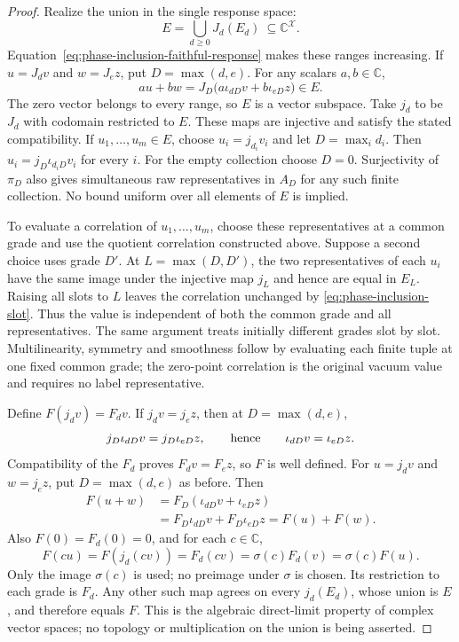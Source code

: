 \begin{proof}
Realize the union in the single response space:
\[
               E=\bigcup_{d\ge0}J_d(E_d)
                    \ \subseteq\mathbb C^{\mathcal X}.
\]
Equation~\eqref{eq:phase-inclusion-faithful-response} makes these ranges
increasing. If $u=J_dv$ and $w=J_ez$, put $D=\max(d,e)$. For any scalars
$a,b\in\mathbb C$,
\[
 au+bw=J_D\bigl(a\iota_{dD}v+b\iota_{eD}z\bigr)\in E.
\]
The zero vector belongs to every range, so $E$ is a vector subspace.
Take $j_d$ to be $J_d$ with codomain restricted to $E$. These maps are
injective and satisfy the stated compatibility. If $u_1,\ldots,u_m\in E$,
choose $u_i=j_{d_i}v_i$ and let $D=\max_i d_i$. Then
$u_i=j_D\iota_{d_iD}v_i$ for every $i$. For the empty collection choose
$D=0$. Surjectivity of $\pi_D$ also gives simultaneous raw representatives
in $A_D$ for any such finite collection. No bound uniform over all elements
of $E$ is implied.

To evaluate a correlation of $u_1,\ldots,u_m$, choose these representatives
at a common grade and use the quotient correlation constructed above.
Suppose a second choice uses grade $D'$. At $L=\max(D,D')$, the two
representatives of each $u_i$ have the same image under the injective map
$j_L$ and hence are equal in $E_L$. Raising all slots to $L$ leaves the
correlation unchanged by \eqref{eq:phase-inclusion-slot}. Thus the value
is independent of both the common grade and all representatives. The same
argument treats initially different grades slot by slot. Multilinearity,
symmetry and smoothness follow by evaluating each finite tuple at one
fixed common grade; the zero-point correlation is the original vacuum
value and requires no label representative.

Define $F(j_dv)=F_dv$. If $j_dv=j_ez$, then at $D=\max(d,e)$,
\[
 j_D\iota_{dD}v=j_D\iota_{eD}z,
 \qquad\hbox{hence}\qquad \iota_{dD}v=\iota_{eD}z.
\]
Compatibility of the $F_d$ proves $F_dv=F_ez$, so $F$ is well defined.
For $u=j_dv$ and $w=j_ez$, put $D=\max(d,e)$ as before. Then
\[
 \begin{aligned}
 F(u+w)&=F_D(\iota_{dD}v+\iota_{eD}z)\\
       &=F_D\iota_{dD}v+F_D\iota_{eD}z=F(u)+F(w).
 \end{aligned}
\]
Also $F(0)=F_d(0)=0$, and for each $c\in\mathbb C$,
\[
 F(cu)=F(j_d(cv))=F_d(cv)=\sigma(c)F_d(v)=\sigma(c)F(u).
\]
Only the image $\sigma(c)$ is used; no preimage under $\sigma$ is
chosen. Its restriction to each grade is $F_d$.
Any other such map agrees on every $j_d(E_d)$, whose union is $E$, and
therefore equals $F$. This is the algebraic direct-limit property of
complex vector spaces; no topology or multiplication on the union is
being asserted.
\end{proof}


